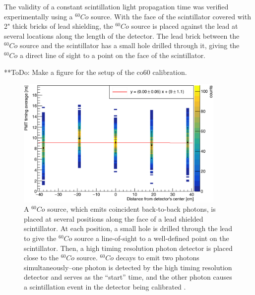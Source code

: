 The validity of a constant scintillation light propagation time was verified experimentally using a $^{60}Co$ source.
With the face of the scintillator covered with 2" thick bricks of lead shielding, the $^{60}Co$ source is placed against the lead at several locations along the length of the detector.
The lead brick between the $^{60}Co$ source and the scintillator has a small hole drilled through it, giving the $^{60}Co$ a direct line of sight to a point on the face of the scintillator.

**ToDo: Make a figure for the setup of the co60 calibration. 

\begin{figure}
    \centering
    \includegraphics[width = 0.9\textwidth]{Content/Methods/CO60Validation.png}
    \caption{A $^{60}Co$ source, which emits coincident back-to-back photons, is placed at several positions along the face of a lead shielded scintillator.
    At each position, a small hole is drilled through the lead to give the $^{60}Co$ source a line-of-sight to a well-defined point on the scintillator.
    Then, a high timing resolution photon detector is placed close to the $^{60}Co$ source.
    $^{60}Co$ decays to emit two photons simultaneously--one photon is detected by the high timing resolution detector and serves as the ``start'' time, and the other photon causes a scintillation event in the detector being calibrated .}
    \label{fig:Co60Validation}
\end{figure}

